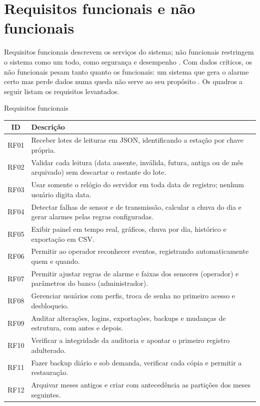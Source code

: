 \section{Requisitos funcionais e não funcionais}\label{cap:requisitos}

Requisitos funcionais descrevem os serviços do sistema; não funcionais restringem o sistema como um todo, como segurança e desempenho \parencite{sommerville2018}. Com dados críticos, os não funcionais pesam tanto quanto os funcionais: um sistema que gera o alarme certo mas perde dados numa queda não serve ao seu propósito \parencite{pressman2021}. Os quadros a seguir listam os requisitos levantados.

\begin{quadro}[htb]
  \caption{Requisitos funcionais}\label{qua:rf}
  \footnotesize
  \begin{tabularx}{\textwidth}{|c|Y|}
    \hline
    \textbf{ID} & \textbf{Descrição} \\ \hline
    RF01 & Receber lotes de leituras em JSON, identificando a estação por chave própria. \\ \hline
    RF02 & Validar cada leitura (data ausente, inválida, futura, antiga ou de mês arquivado) sem descartar o restante do lote. \\ \hline
    RF03 & Usar somente o relógio do servidor em toda data de registro; nenhum usuário digita data. \\ \hline
    RF04 & Detectar falhas de sensor e de transmissão, calcular a chuva do dia e gerar alarmes pelas regras configuradas. \\ \hline
    RF05 & Exibir painel em tempo real, gráficos, chuva por dia, histórico e exportação em CSV. \\ \hline
    RF06 & Permitir ao operador reconhecer eventos, registrando automaticamente quem e quando. \\ \hline
    RF07 & Permitir ajustar regras de alarme e faixas dos sensores (operador) e parâmetros do banco (administrador). \\ \hline
    RF08 & Gerenciar usuários com perfis, troca de senha no primeiro acesso e desbloqueio. \\ \hline
    RF09 & Auditar alterações, logins, exportações, backups e mudanças de estrutura, com antes e depois. \\ \hline
    RF10 & Verificar a integridade da auditoria e apontar o primeiro registro adulterado. \\ \hline
    RF11 & Fazer backup diário e sob demanda, verificar cada cópia e permitir a restauração. \\ \hline
    RF12 & Arquivar meses antigos e criar com antecedência as partições dos meses seguintes. \\ \hline
  \end{tabularx}
\end{quadro}

